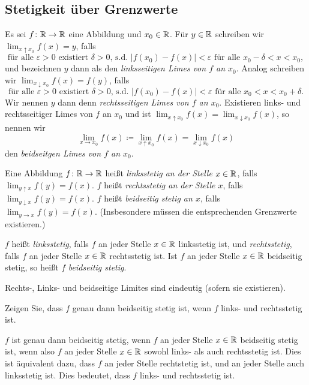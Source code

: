 \documentclass[a4paper,10pt]{article}
\begin{document}
\subsection{Stetigkeit über Grenzwerte}


\begin{defi}
 Es sei $f \colon \mathbb{R} \to \mathbb{R}$ eine Abbildung und $x_0 \in \mathbb{R}$. Für $y \in \mathbb{R}$ schreiben wir $\lim_{x \uparrow x_0} f(x) = y$, falls
 \[
  \text{für alle $\varepsilon > 0$ existiert $\delta > 0$, s.d.\ $|f(x_0)-f(x)| < \varepsilon$ für alle $x_0-\delta < x < x_0$},
 \]
 und bezeichnen $y$ dann als den \emph{linksseitigen Limes von $f$ an $x_0$}. Analog schreiben wir \mbox{$\lim_{x \downarrow x_0} f(x) = f(y)$}, falls
 \[
  \text{für alle $\varepsilon > 0$ existiert $\delta > 0$, s.d.\ $|f(x_0)-f(x)| < \varepsilon$ für alle $x_0 < x < x_0+\delta$}.
 \]
 Wir nennen $y$ dann denn \emph{rechtsseitigen Limes von $f$ an $x_0$}. Existieren links- und rechtsseitiger Limes von $f$ an $x_0$ und ist $\lim_{x \uparrow x_0} f(x) = \lim_{x \downarrow x_0} f(x)$, so nennen wir
 \[
  \lim_{x \to x_0} f(x) \coloneqq \lim_{x \uparrow x_0} f(x) = \lim_{x \downarrow x_0} f(x)
 \]
 den \emph{beidseitgen Limes von $f$ an $x_0$}.
\end{defi}


\begin{defi}
 Eine Abbildung $f \colon \mathbb{R} \to \mathbb{R}$ heißt \emph{linksstetig an der Stelle $x \in \mathbb{R}$}, falls $\lim_{y \uparrow x} f(y) = f(x)$. $f$ heißt \emph{rechtsstetig an der Stelle $x$}, falls $\lim_{y \downarrow x} f(y) = f(x)$. $f$ heißt \emph{beidseitig stetig an $x$}, falls $\lim_{y \to x} f(y) = f(x)$. (Insbesondere müssen die entsprechenden Grenzwerte existieren.)
 
 $f$ heißt \emph{linksstetig}, falls $f$ an jeder Stelle $x \in \mathbb{R}$ linksstetig ist, und \emph{rechtsstetig}, falls $f$ an jeder Stelle $x \in \mathbb{R}$ rechtsstetig ist. Ist $f$ an jeder Stelle $x \in \mathbb{R}$ beidseitig stetig, so heißt $f$ \emph{beidseitig stetig}.
\end{defi}


\begin{bem}
 Rechts-, Links- und beidseitige Limites sind eindeutig (sofern sie existieren).
\end{bem}


\begin{question}
 Zeigen Sie, dass $f$ genau dann beidseitig stetig ist, wenn $f$ links- und rechtsstetig ist.
\end{question}
\begin{solution}
 $f$ ist genau dann beidseitig stetig, wenn $f$ an jeder Stelle $x \in \mathbb{R}$ beidseitig stetig ist, wenn also $f$ an jeder Stelle $x \in \mathbb{R}$ sowohl links- als auch rechtsstetig ist. Dies ist äquivalent dazu, dass $f$ an jeder Stelle rechtstetig ist, und an jeder Stelle auch linksstetig ist. Dies bedeutet, dass $f$ links- und rechtsstetig ist.
\end{solution}
\end{document}
